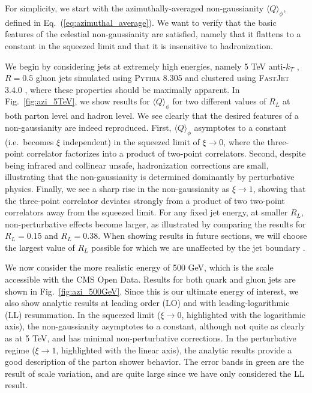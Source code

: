 \documentclass[letterpaper,11pt]{article}
\def\Fig#1{Fig.~{\ref{#1}}}
\def\to{\rightarrow}
\DeclareRobustCommand{\Fig}[1]{Fig.~\ref{#1}}
\DeclareRobustCommand{\Eq}[1]{Eq.~(\ref{#1})}
\begin{document}
For simplicity, we start with the azimuthally-averaged non-gaussianity $\langle Q \rangle_\phi$, defined in \Eq{eq:azimuthal_average}.
%
We want to verify that the basic features of the celestial non-gaussianity are satisfied, namely that it flattens to a constant in the squeezed limit and that it is insensitive to hadronization.


We begin by considering jets at extremely high energies, namely 5 TeV anti-$k_T$ \cite{Cacciari:2008gp}, $R=0.5$ gluon jets simulated using \textsc{Pythia} 8.305 \cite{Sjostrand:2014zea,Sjostrand:2007gs} and clustered using \textsc{FastJet} 3.4.0 \cite{Cacciari:2011ma}, where these properties should be maximally apparent.
%
In \Fig{fig:azi_5TeV}, we show results for $\langle Q \rangle_\phi$ for two different values of $R_L$ at both parton level and hadron level.
%
We see clearly that the desired features of a non-gaussianity are indeed reproduced.
%
First, $\langle Q \rangle_\phi$ asymptotes to a constant (i.e.~becomes $\xi$ independent) in the squeezed limit of $\xi\to 0$, where the three-point correlator factorizes into a product of two-point correlators.
%
Second, despite being infrared and collinear unsafe, hadronization corrections are small, illustrating that the non-gaussianity is determined dominantly by perturbative physics.
%
Finally, we see a sharp rise in the non-gaussianity as $\xi\to 1$, showing that the three-point correlator deviates strongly from a product of two two-point correlators away from the squeezed limit. 
%
For any fixed jet energy, at smaller $R_L$, non-perturbative effects become larger, as illustrated by comparing the results for $R_L=0.15$ and $R_L=0.38$. When showing results in future sections, we will choose the largest value of $R_L$ possible for which we are unaffected by the jet boundary \cite{Komiske:2022enw}.


We now consider the more realistic energy of 500 GeV, which is the scale accessible with the CMS Open Data.
%
Results for both quark and gluon jets are shown in \Fig{fig:azi_500GeV}.
%
Since this is our ultimate energy of interest, we also show analytic results at leading order (LO) and with leading-logarithmic (LL) resummation.
%
In the squeezed limit ($\xi \to 0$, highlighted with the logarithmic axis), the non-gaussianity asymptotes to a constant, although not quite as clearly as at 5 TeV, and has minimal non-perturbative corrections.
%
In the perturbative regime ($\xi\to 1$, highlighted with the linear axis), the analytic results provide a good description of the parton shower behavior.
%
The error bands in green are the result of scale variation, and are quite large since we have only considered the LL result. 
\end{document}
